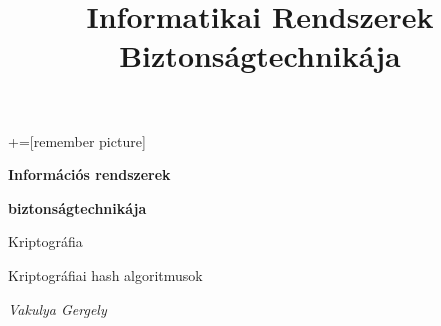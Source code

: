 \documentclass[12 pt]{beamer}
\author{}
\title{Informatikai Rendszerek Biztonságtechnikája}
\institute{}
\date{}
\begin{document}
+=[remember picture]

{

  \begin{frame}[c]
    \begin{center}

      \Large
      \textbf{Információs rendszerek}

      \textbf{biztonságtechnikája}

      \qquad

      Kriptográfia

      Kriptográfiai hash algoritmusok

      \qquad

      \textit{Vakulya Gergely}

    \end{center}
  \end{frame}
}

\end{document}
